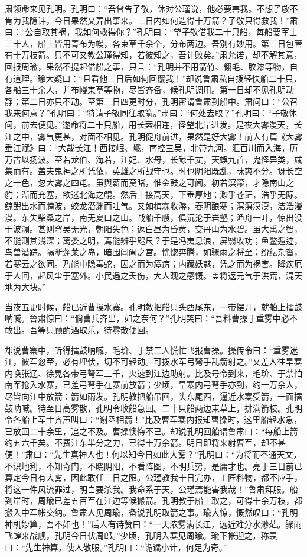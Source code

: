 肃领命来见孔明。孔明曰：“吾曾告子敬，休对公瑾说，他必要害我。不想子敬不肯为我隐讳，今日果然又弄出事来。三日内如何造得十万箭？子敬只得救我！”肃曰：“公自取其祸，我如何救得你？”孔明曰：“望子敬借我二十只船，每船要军士三十人，船上皆用青布为幔，各束草千余个，分布两边。吾别有妙用。第三日包管有十万枝箭。只不可又教公瑾得知，若彼知之，吾计败矣。”肃允诺，却不解其意，回报周瑜，果然不提起借船之事，只言：“孔明并不用箭竹、翎毛、胶漆等物，自有道理。”瑜大疑曰：“且看他三日后如何回覆我！”却说鲁肃私自拨轻快船二十只，各船三十余人，并布幔束草等物，尽皆齐备，候孔明调用。第一日却不见孔明动静；第二日亦只不动。至第三日四更时分，孔明密请鲁肃到船中。肃问曰：“公召我来何意？”孔明曰：“特请子敬同往取箭。”肃曰：“何处去取？”孔明曰：“子敬休问，前去便见。”遂命将二十只船，用长索相连，径望北岸进发。是夜大雾漫天，长江之中，雾气更甚，对面不相见。孔明促舟前进，果然是好大雾！前人有篇《大雾垂江赋》曰：“大哉长江！西接岷、峨，南控三吴，北带九河。汇百川而入海，历万古以扬波。至若龙伯、海若，江妃、水母，长鲸千丈，天蜈九首，鬼怪异类，咸集而有。盖夫鬼神之所凭依，英雄之所战守也。时也阴阳既乱，昧爽不分。讶长空之一色，忽大雾之四屯。虽舆薪而莫睹，惟金鼓之可闻。初若溟濛，才隐南山之豹；渐而充塞，欲迷北海之鲲。然后上接高天，下垂厚地；渺乎苍茫，浩乎无际。鲸鲵出水而腾波，蛟龙潜渊而吐气。又如梅霖收溽，春阴酿寒；溟溟漠漠，洁浩漫漫。东失柴桑之岸，南无夏口之山。战船千艘，俱沉沦于岩壑；渔舟一叶，惊出没于波澜。甚则穹吴无光，朝阳失色；返白昼为昏黄，变丹山为水碧。虽大禹之智，不能测其浅深；离娄之明，焉能辨乎咫尺？于是冯夷息浪，屏翳收功；鱼鳖遁迹，鸟兽潜踪。隔断蓬莱之岛，暗围阊阖之宫。恍惚奔腾，如骤雨之将至；纷纭杂沓，若寒云之欲同。乃能中隐毒蛇，因之而为瘴疠；内藏妖魅，凭之而为祸害。降疾厄于人间，起风尘于塞外。小民遇之夭伤，大人观之感慨。盖将返元气于洪荒，混天地为大块。”

当夜五更时候，船已近曹操水寨。孔明教把船只头西尾东，一带摆开，就船上擂鼓呐喊。鲁肃惊曰：“倘曹兵齐出，如之奈何？”孔明笑曰：“吾料曹操于重雾中必不敢出。吾等只顾酌酒取乐，待雾散便回。

却说曹寨中，听得擂鼓呐喊，毛玠、于禁二人慌忙飞报曹操。操传令曰：“重雾迷江，彼军忽至，必有埋伏，切不可轻动。可拨水军弓弩手乱箭射之。”又差人往旱寨内唤张辽、徐晃各带弓弩军三千，火速到江边助射。比及号令到来，毛玠、于禁怕南军抢入水寨，已差弓弩手在寨前放箭；少顷，旱寨内弓弩手亦到，约一万余人，尽皆向江中放箭：箭如雨发。孔明教把船吊回，头东尾西，逼近水寨受箭，一面擂鼓呐喊。待至日高雾散，孔明令收船急回。二十只船两边束草上，排满箭枝。孔明令各船上军士齐声叫曰：“谢丞相箭！”比及曹军寨内报知曹操时，这里船轻水急，已放回二十余里，追之不及。曹操懊悔不已。却说孔明回船谓鲁肃曰：“每船上箭约五六千矣。不费江东半分之力，已得十万余箭。明日即将来射曹军，却不甚便！”肃曰：“先生真神人也！何以知今日如此大雾？”孔明曰：“为将而不通天文，不识地利，不知奇门，不晓阴阳，不看阵图，不明兵势，是庸才也。亮于三日前已算定今日有大雾，因此敢任三日之限。公瑾教我十日完办，工匠料物，都不应手，将这一件风流罪过，明白要杀我。我命系于天，公瑾焉能害我哉！”鲁肃拜服。船到岸时，周瑜已差五百军在江边等候搬箭。孔明教于船上取之，可得十余万枝，都搬入中军帐交纳。鲁肃人见周瑜，备说孔明取箭之事。瑜大惊，慨然叹曰：“孔明神机妙算，吾不如也！”后人有诗赞曰：“一天浓雾满长江，远近难分水渺茫。骤雨飞蝗来战舰，孔明今日伏周郎。”少顷，孔明入寨见周瑜。瑜下帐迎之，称羡曰：“先生神算，使人敬服。”孔明曰：“诡谲小计，何足为奇。”

